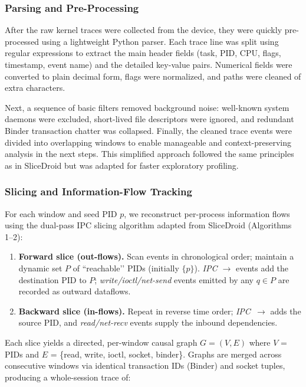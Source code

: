 \documentclass[a4paper,12pt]{report}
\begin{document}
\subsubsection{Parsing and Pre-Processing}
After the raw kernel traces were collected from the device, they were quickly pre-processed using a lightweight Python parser. Each trace line was split using regular expressions to extract the main header fields (task, PID, CPU, flags, timestamp, event name) and the detailed key-value pairs. Numerical fields were converted to plain decimal form, flags were normalized, and paths were cleaned of extra characters.

Next, a sequence of basic filters removed background noise: well-known system daemons were excluded, short-lived file descriptors were ignored, and redundant Binder transaction chatter was collapsed. Finally, the cleaned trace events were divided into overlapping windows to enable manageable and context-preserving analysis in the next steps. This simplified approach followed the same principles as in SliceDroid but was adapted for faster exploratory profiling.

\subsubsection{Slicing and Information-Flow Tracking}

For each window and seed PID $p$, we reconstruct per-process
information flows using the dual-pass IPC slicing algorithm adapted
from SliceDroid (Algorithms 1–2):

\begin{enumerate}
  \item \textbf{Forward slice (out-flows).}
        Scan events in chronological order; maintain a dynamic set
        $P$ of “reachable’’ PIDs (initially $\{p\}$).
        \emph{IPC $\rightarrow$} events add the destination PID to $P$;
        \emph{write/ioctl/net-send} events emitted by any
        $q\!\in\!P$ are recorded as outward dataflows.
  \item \textbf{Backward slice (in-flows).}
        Repeat in reverse time order; \emph{IPC~$\rightarrow$} adds
        the source PID, and \emph{read/net-recv} events supply the
        inbound dependencies.
\end{enumerate}

Each slice yields a directed, per-window causal graph
$G=(V,E)$ where
$V$ = PIDs and $E$ = \{read, write, ioctl, socket, binder\}.
Graphs are merged across consecutive windows via identical
transaction IDs (Binder) and socket tuples, producing a
whole-session trace of:
\end{document}
